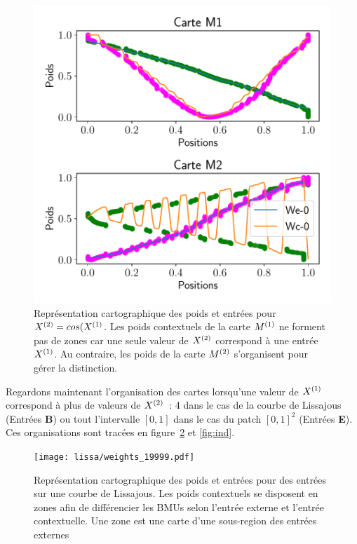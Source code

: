 \documentclass[../main]{subfiles}
\begin{document}
	\begin{figure}[h!]
		\centering\includegraphics[width=\textwidth]{2som_cos_w.pdf}
		\caption{Représentation cartographique des poids et entrées pour $X^{({2})} = cos(X^{({1})}$. Les poids contextuels de la carte $M^{({1})}$ ne forment pas de zones car une seule valeur de $X^{({2})}$ correspond à une entrée $X^{({1})}$. Au contraire, les poids de la carte $M^{({2})}$ s'organisent pour gérer la distinction. \label{fig:cos_results}}
	\end{figure}

Regardons maintenant l'organisation des cartes lorsqu'une valeur de $X^{({1})}$ correspond à plus de valeurs de $X^{({2})}$~: 4 dans le cas de la courbe de Lissajous (Entrées \textbf{B}) ou tout l'intervalle $[0,1]$ dans le cas du patch $[0,1]^2$ (Entrées \textbf{E}). Ces organisations sont tracées en figure~\ref{fig:lissa} et \ref{fig:ind}.

\begin{figure}[h!]
	\centering\texttt{[image: lissa/weights\_19999.pdf]}
	\caption{Représentation cartographique des poids et entrées pour des entrées sur une courbe de Lissajous. Les poids contextuels se disposent en zones afin de différencier les BMUs selon l'entrée externe et l'entrée contextuelle. Une zone est une carte d'une sous-region des entrées externes \label{fig:lissa}}
\end{figure}
\end{document}
